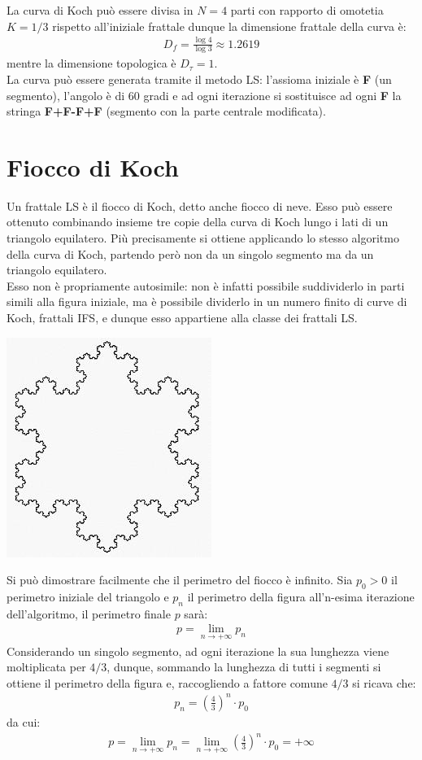 \documentclass[10pt]{report}
\begin{document}
			La curva di Koch può essere divisa in $N = 4$ parti con rapporto di omotetia $K = 1/3$ rispetto all'iniziale frattale dunque la dimensione frattale della curva è:
			\begin{gather*}
				D_f = \frac{\log 4}{\log 3} \approx 1.2619
			\end{gather*}
			mentre la dimensione topologica è $D_{\tau} = 1$.\\
			La curva può essere generata tramite il metodo LS: l'assioma iniziale è \textbf{F} (un segmento), l'angolo è di $60$ gradi e ad ogni iterazione si sostituisce ad ogni \textbf{F} la stringa \textbf {F+F-F+F} (segmento con la parte centrale modificata).
		\section{Fiocco di Koch}
			Un frattale LS è il fiocco di Koch, detto anche fiocco di neve. Esso può essere ottenuto combinando insieme tre copie della curva di Koch lungo i lati di un triangolo equilatero. Più precisamente si ottiene applicando lo stesso algoritmo della curva di Koch, partendo però non da un singolo segmento ma da un triangolo equilatero.\\
			Esso non è propriamente autosimile: non è infatti possibile suddividerlo in parti simili alla figura iniziale, ma è possibile dividerlo in un numero finito di curve di Koch, frattali IFS, e dunque esso appartiene alla classe dei frattali LS.
			\begin{center}
				\includegraphics[width=0.3\linewidth, height=0.2\textheight]{"Fiocco di Koch/fioccodineve"}
			\end{center}
			Si può dimostrare facilmente che il perimetro del fiocco è infinito. 
			Sia $p_0 > 0$ il perimetro iniziale del triangolo e $p_n$ il perimetro della figura all'n-esima iterazione dell'algoritmo, il perimetro finale $p$ sarà:
			\begin{gather*}
				p = \lim_{n \rightarrow + \infty} p_n
			\end{gather*}
			Considerando un singolo segmento, ad ogni iterazione la sua lunghezza viene moltiplicata per $4 / 3$, dunque, sommando la lunghezza di tutti i segmenti si ottiene il perimetro della figura e, raccogliendo a fattore comune $4/3$ si ricava che:
			\begin{gather*}
				p_n = \left( \frac{4}{3} \right)^n \cdot p_0
			\end{gather*}
			da cui:
			\begin{gather*}
				p = \lim_{n \rightarrow + \infty} p_n = \lim_{n \rightarrow + \infty} \left(\frac{4}{3} \right)^n \cdot p_0 = + \infty
			\end{gather*}
			
\end{document}
